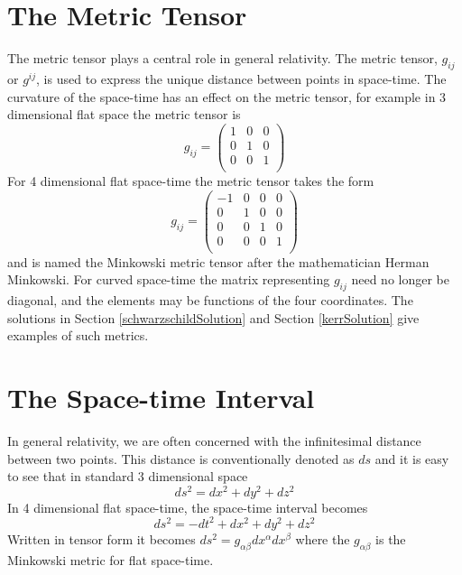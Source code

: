 \documentclass[12pt, oneside]{smuthesis}
\newcommand{\contensor}[2]{{#1}^{#2}}
\newcommand{\covtensor}[2]{{#1}_{#2}}
\begin{document}
\section{\sc The Metric Tensor} \label{metricTensor}

The metric tensor plays a central role in general relativity. The metric tensor, $\covtensor{g}{ij}$ or $\contensor{g}{ij}$, is used to express the unique distance between points in space-time. The curvature of the space-time has an effect on the metric tensor, for example in 3 dimensional flat space the metric tensor is
\begin{equation}
\covtensor{g}{ij}=
\begin{pmatrix}
1 & 0 & 0 \\
0 & 1 & 0 \\
0 & 0 & 1 \\
\end{pmatrix}
\end{equation}\label{genten}
For 4 dimensional flat space-time the metric tensor takes the form
\begin{equation}
\covtensor{g}{ij}=
\begin{pmatrix}
-1 & 0 & 0 & 0 \\
0 & 1 & 0 & 0 \\
0 & 0 & 1 & 0 \\
0 & 0 & 0 & 1 \\
\end{pmatrix}
\end{equation}\label{minkten}
and is named the Minkowski metric tensor after the mathematician Herman Minkowski. For curved space-time the matrix representing $\covtensor{g}{ij}$ need no longer be diagonal, and the elements may be functions of the four coordinates. The solutions in Section \ref{schwarzschildSolution} and Section \ref{kerrSolution} give examples of such metrics.

\section{\sc The Space-time Interval} \label{spacetimeInterval}

In general relativity, we are often concerned with the infinitesimal distance between two points. This distance is conventionally denoted as $ds$ and it is easy to see that in standard 3 dimensional space
\begin{equation}
\nonumber
ds^{2}=dx^{2}+dy^{2}+dz^{2}
\end{equation}
In 4 dimensional flat space-time, the space-time interval becomes
\begin{equation}
ds^{2}=-dt^{2}+dx^{2}+dy^{2}+dz^{2}
\end{equation}
Written in tensor form it becomes $ds^{2}=\covtensor{g}{\alpha\beta}dx^{\alpha}dx^{\beta}$ where the $\covtensor{g}{\alpha\beta}$ is the Minkowski metric for flat space-time.
\end{document}
